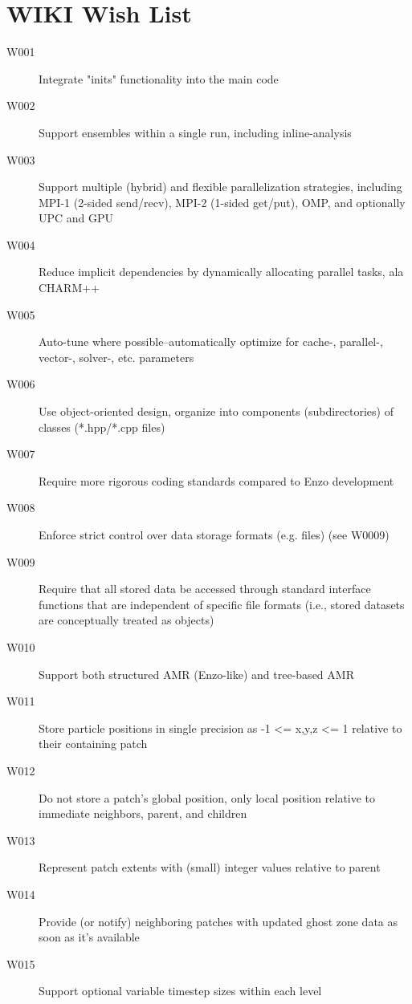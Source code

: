 \documentclass{book}
\begin{document}
\section{WIKI Wish List}

\begin{description}
 \item[W001] Integrate "inits" functionality into the main code
 \item[W002] Support ensembles within a single run, including inline-analysis
 \item[W003] Support multiple (hybrid) and flexible parallelization strategies, including MPI-1 (2-sided send/recv), MPI-2 (1-sided get/put), OMP, and optionally UPC and GPU
 \item[W004] Reduce implicit dependencies by dynamically allocating parallel tasks, ala CHARM++
 \item[W005] Auto-tune where possible--automatically optimize for cache-, parallel-, vector-, solver-, etc. parameters
 \item[W006] Use object-oriented design, organize into components (subdirectories) of classes (*.hpp/*.cpp files)
 \item[W007] Require more rigorous coding standards compared to Enzo development
 \item[W008] Enforce strict control over data storage formats (e.g. files) (see W0009)
 \item[W009] Require that all stored data be accessed through standard interface functions that are independent of specific file formats (i.e., stored datasets are conceptually treated as objects)
 \item[W010] Support both structured AMR (Enzo-like) and tree-based AMR
 \item[W011] Store particle positions in single precision as -1 <= x,y,z <= 1 relative to their containing patch
 \item[W012] Do not store a patch's global position, only local position relative to immediate neighbors, parent, and children
 \item[W013] Represent patch extents with (small) integer values relative to parent
 \item[W014] Provide (or notify) neighboring patches with updated ghost zone data as soon as it's available
 \item[W015] Support optional variable timestep sizes within each level

\end{description}
\end{document}
